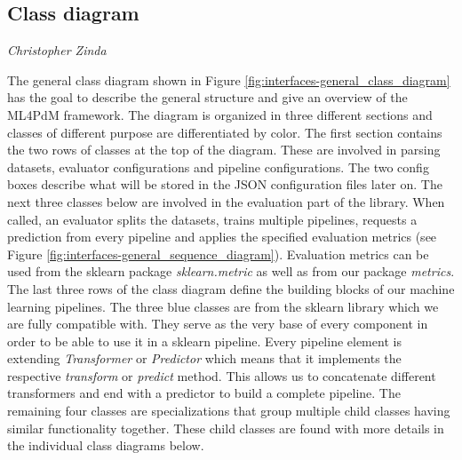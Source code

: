 \subsection*{Class diagram}
\vspace*{-10mm}\hfill{\normalsize\emph{Christopher Zinda}}

The general class diagram shown in Figure \ref{fig:interfaces-general_class_diagram} has the goal to describe the general structure and give an overview of the ML4PdM framework. The diagram is organized in three different sections and classes of different purpose are differentiated by color. The first section contains the two rows of classes at the top of the diagram. These are involved in parsing datasets, evaluator configurations and pipeline configurations. The two config boxes describe what will be stored in the JSON configuration files later on. The next three classes below are involved in the evaluation part of the library. When called, an evaluator splits the datasets, trains multiple pipelines, requests a prediction from every pipeline and applies the specified evaluation metrics (see Figure \ref{fig:interfaces-general_sequence_diagram}). Evaluation metrics can be used from the sklearn package \textit{sklearn.metric} as well as from our package \textit{metrics}. The last three rows of the class diagram define the building blocks of our machine learning pipelines. The three blue classes are from the sklearn library which we are fully compatible with. They serve as the very base of every component in order to be able to use it in a sklearn pipeline. Every pipeline element is extending \textit{Transformer} or \textit{Predictor} which means that it implements the respective \textit{transform} or \textit{predict} method. This allows us to concatenate different transformers and end with a predictor to build a complete pipeline. The remaining four classes are specializations that group multiple child classes having similar functionality together. These child classes are found with more details in the individual class diagrams below.

